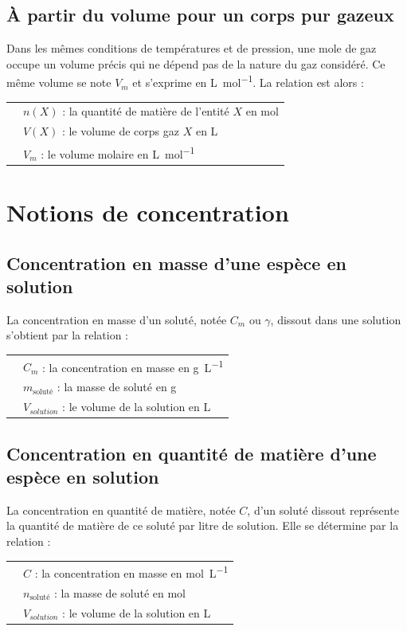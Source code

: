 \documentclass[a4paper,11pt,fleqn]{scrartcl}%
\begin{document}
	\subsection{À partir du volume pour un corps pur gazeux}
	Dans les mêmes conditions de températures et de pression, une mole de gaz occupe un volume précis qui ne dépend pas de la nature du gaz considéré. Ce même volume se note $V_m$ et s’exprime en \unit{\liter\per\mole}. La relation est alors :\\
	\begin{tabular}{>{\centering} m{6cm}|m{12cm}}
		\multirow{3}{*}{$n(X) = \dfrac{V(X)}{V_m}$} & $n(X)$ : la quantité de matière de l'entité $X$ en \unit{\mole}\\
		& $V(X)$ : le volume de corps gaz $X$ en \unit{\liter}\\
		& $V_m$ : le volume molaire en \unit{\liter \per \mole}\\
	\end{tabular}

\section{Notions de concentration}
	\subsection{Concentration en masse d'une espèce en solution}
	La concentration en masse d'un soluté, notée $C_m$ ou $\gamma$, dissout dans une solution s'obtient par la relation :\\
	\begin{tabular}{>{\centering} m{6cm}|m{12cm}}
		\multirow{3}{*}{$C_m = \dfrac{m_{\text{\textit{soluté}}}}{V_{solution}}$} & $C_m$ : la concentration en masse  en \unit{\gram\per\liter}\\
		& $m_{\text{soluté}}$ : la masse de soluté en \unit{\gram}\\
		& $V_{solution}$ : le volume de la solution en \unit{\liter}\\
	\end{tabular}
	
	\subsection{Concentration en quantité de matière d'une espèce en solution}
	La concentration en quantité de matière, notée $C$, d'un soluté dissout représente la quantité de matière de ce soluté par litre de solution. Elle se détermine par la relation :\\
	\begin{tabular}{>{\centering} m{6cm}|m{12cm}}
		\multirow{3}{*}{$C = \dfrac{n_{\text{\textit{soluté}}}}{V_{solution}}$} & $C$ : la concentration en masse  en \unit{\mole\per\liter}\\
		& $n_{\text{soluté}}$ : la masse de soluté en \unit{\mole}\\
		& $V_{solution}$ : le volume de la solution en \unit{\liter}\\
	\end{tabular}
	
\end{document}

